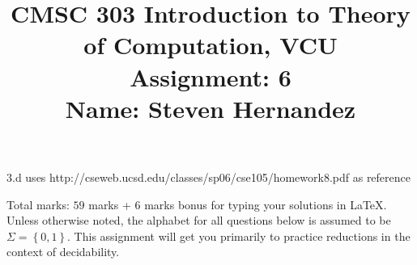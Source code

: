 \documentclass{article}
\newcommand{\set}[1]{{\left\{#1\right\}}}    %
\begin{document}
\title{
    CMSC 303 Introduction to Theory of Computation, VCU\\
    Assignment: 6\\
    Name: Steven Hernandez
}

\date{}
\maketitle

\vspace{-5mm}
\noindent 3.d uses http://cseweb.ucsd.edu/classes/sp06/cse105/homework8.pdf as reference

\noindent Total marks: $59$ marks + $6$ marks bonus for typing your solutions in LaTeX.\vspace{2mm}\\

\noindent Unless otherwise noted, the alphabet for all questions below is assumed to be $\Sigma=\set{0,1}$. This assignment will get you primarily to practice reductions in the context of decidability.
\end{document}
